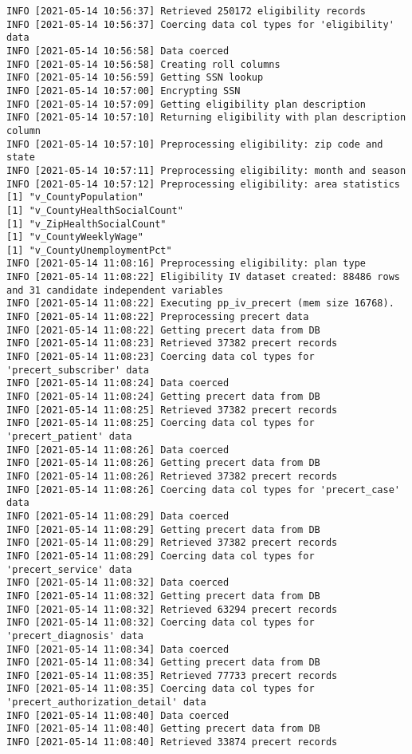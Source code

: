 \documentclass[
]{book}
\begin{document}
\begin{verbatim}
INFO [2021-05-14 10:56:37] Retrieved 250172 eligibility records
INFO [2021-05-14 10:56:37] Coercing data col types for 'eligibility' data
INFO [2021-05-14 10:56:58] Data coerced
INFO [2021-05-14 10:56:58] Creating roll columns
INFO [2021-05-14 10:56:59] Getting SSN lookup
INFO [2021-05-14 10:57:00] Encrypting SSN
INFO [2021-05-14 10:57:09] Getting eligibility plan description
INFO [2021-05-14 10:57:10] Returning eligibility with plan description column
INFO [2021-05-14 10:57:10] Preprocessing eligibility: zip code and state
INFO [2021-05-14 10:57:11] Preprocessing eligibility: month and season
INFO [2021-05-14 10:57:12] Preprocessing eligibility: area statistics
[1] "v_CountyPopulation"
[1] "v_CountyHealthSocialCount"
[1] "v_ZipHealthSocialCount"
[1] "v_CountyWeeklyWage"
[1] "v_CountyUnemploymentPct"
INFO [2021-05-14 11:08:16] Preprocessing eligibility: plan type
INFO [2021-05-14 11:08:22] Eligibility IV dataset created: 88486 rows and 31 candidate independent variables
INFO [2021-05-14 11:08:22] Executing pp_iv_precert (mem size 16768).
INFO [2021-05-14 11:08:22] Preprocessing precert data
INFO [2021-05-14 11:08:22] Getting precert data from DB
INFO [2021-05-14 11:08:23] Retrieved 37382 precert records
INFO [2021-05-14 11:08:23] Coercing data col types for 'precert_subscriber' data
INFO [2021-05-14 11:08:24] Data coerced
INFO [2021-05-14 11:08:24] Getting precert data from DB
INFO [2021-05-14 11:08:25] Retrieved 37382 precert records
INFO [2021-05-14 11:08:25] Coercing data col types for 'precert_patient' data
INFO [2021-05-14 11:08:26] Data coerced
INFO [2021-05-14 11:08:26] Getting precert data from DB
INFO [2021-05-14 11:08:26] Retrieved 37382 precert records
INFO [2021-05-14 11:08:26] Coercing data col types for 'precert_case' data
INFO [2021-05-14 11:08:29] Data coerced
INFO [2021-05-14 11:08:29] Getting precert data from DB
INFO [2021-05-14 11:08:29] Retrieved 37382 precert records
INFO [2021-05-14 11:08:29] Coercing data col types for 'precert_service' data
INFO [2021-05-14 11:08:32] Data coerced
INFO [2021-05-14 11:08:32] Getting precert data from DB
INFO [2021-05-14 11:08:32] Retrieved 63294 precert records
INFO [2021-05-14 11:08:32] Coercing data col types for 'precert_diagnosis' data
INFO [2021-05-14 11:08:34] Data coerced
INFO [2021-05-14 11:08:34] Getting precert data from DB
INFO [2021-05-14 11:08:35] Retrieved 77733 precert records
INFO [2021-05-14 11:08:35] Coercing data col types for 'precert_authorization_detail' data
INFO [2021-05-14 11:08:40] Data coerced
INFO [2021-05-14 11:08:40] Getting precert data from DB
INFO [2021-05-14 11:08:40] Retrieved 33874 precert records

\end{verbatim}
\end{document}
